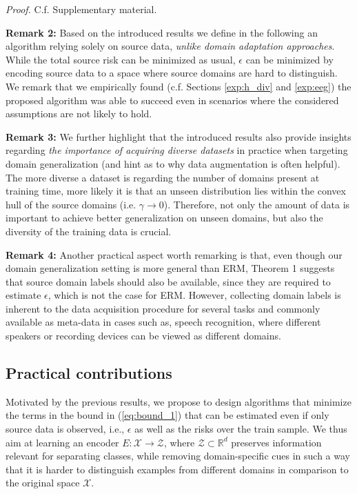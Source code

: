 \documentclass{article}
\begin{document}
\textit{Proof.} C.f. Supplementary material.

\textbf{Remark 2:} Based on the introduced results we define in the following an algorithm relying solely on source data, \emph{unlike domain adaptation approaches}. While the total source risk can be minimized as usual, $\epsilon$ can be minimized by encoding source data to a space where source domains are hard to distinguish. We remark that we empirically found (c.f. Sections \ref{exp:h_div} and \ref{exp:eeg}) the proposed algorithm was able to succeed even in scenarios where the considered assumptions are not likely to hold. 

\textbf{Remark 3:} We further highlight that the introduced results also provide insights regarding \emph{the importance of acquiring diverse datasets} in practice when targeting domain generalization (and hint as to why data augmentation is often helpful). The more diverse a dataset is regarding the number of domains present at training time, more likely it is that an unseen distribution lies within the convex hull of the source domains (i.e. $\gamma \rightarrow 0$). Therefore, not only the amount of data is important to achieve better generalization on unseen domains, but also the diversity of the training data is crucial. 

\textbf{Remark 4:} Another practical aspect worth remarking is that, even though our domain generalization setting is more general than ERM, Theorem 1 suggests that source domain labels should also be available, since they are required to estimate $\epsilon$, which is not the case for ERM. However, collecting domain labels is inherent to the data acquisition procedure for several tasks and commonly available as meta-data in cases such as, speech recognition, where different speakers or recording devices can be viewed as different domains.

\subsection{Practical contributions}
Motivated by the previous results, we propose to design algorithms that minimize the terms in the bound in (\ref{eq:bound_1}) that can be estimated even if only source data is observed, i.e., $\epsilon$ as well as the risks over the train sample. We thus aim at learning an encoder $E: \mathcal{X} \rightarrow \mathcal{Z}$, where $\mathcal{Z}\subset\mathbb{R}^d$ preserves information relevant for separating classes, while removing domain-specific cues in such a way that it is harder to distinguish examples from different domains in comparison to the original space $\mathcal{X}$.  
\end{document}
